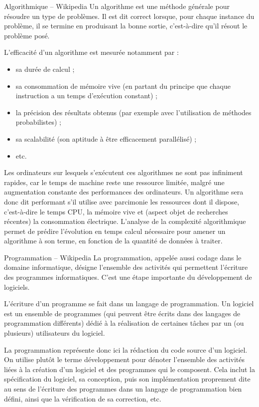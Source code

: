 \begin{defi}{Algorithmique -- Wikipedia}
Un algorithme est une méthode générale pour résoudre un type de problèmes. Il est dit correct lorsque, pour chaque instance du problème, il se termine en produisant la bonne sortie, c'est-à-dire qu'il résout le problème posé.
\end{defi}

L'efficacité d'un algorithme est mesurée notamment par :
\begin{itemize}
\item sa durée de calcul ;
\item sa consommation de mémoire vive (en partant du principe que chaque instruction a un temps d'exécution constant) ;
\item la précision des résultats obtenus (par exemple avec l'utilisation de méthodes probabilistes) ;
\item sa scalabilité (son aptitude à être efficacement parallélisé) ;
\item etc.
\end{itemize}

Les ordinateurs sur lesquels s'exécutent ces algorithmes ne sont pas infiniment rapides, car le temps de machine reste une ressource limitée, malgré une augmentation constante des performances des ordinateurs. Un algorithme sera donc dit performant s'il utilise avec parcimonie les ressources dont il dispose, c'est-à-dire le temps CPU, la mémoire vive et (aspect objet de recherches récentes) la consommation électrique. L’analyse de la complexité algorithmique permet de prédire l'évolution en temps calcul nécessaire pour amener un algorithme à son terme, en fonction de la quantité de données à traiter.

\begin{defi}{Programmation -- Wikipedia}
La programmation, appelée aussi codage dans le domaine informatique, désigne l'ensemble des activités qui permettent l'écriture des programmes informatiques. C'est une étape importante du développement de logiciels.

L'écriture d'un programme se fait dans un langage de programmation. Un logiciel est un ensemble de programmes (qui peuvent être écrits dans des langages de programmation différents) dédié à la réalisation de certaines tâches par un (ou plusieurs) utilisateurs du logiciel.

\end{defi}

La programmation représente donc ici la rédaction du code source d'un logiciel. On utilise plutôt le terme développement pour dénoter l'ensemble des activités liées à la création d'un logiciel et des programmes qui le composent. Cela inclut la spécification du logiciel, sa conception, puis son implémentation proprement dite au sens de l'écriture des programmes dans un langage de programmation bien défini, ainsi que la vérification de sa correction, etc.

